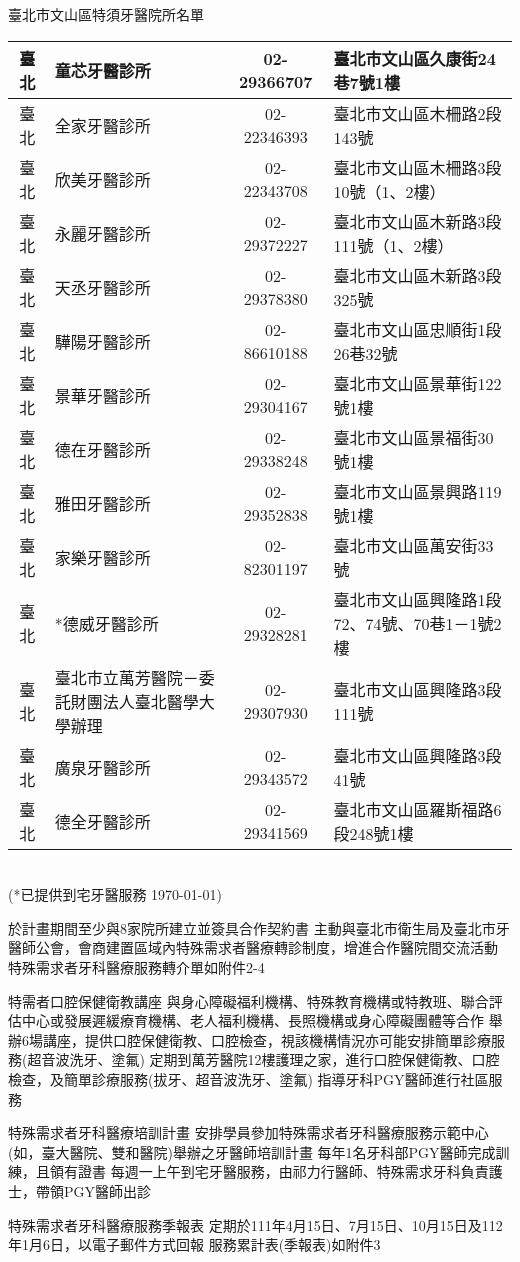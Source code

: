 臺北市文山區特須牙醫院所名單\\
\begin{tabularx}{1.0625\textwidth}{|c|p{3.2cm}|c|l|}
\hline
臺北&	童芯牙醫診所&	02-29366707 &	臺北市文山區久康街24巷7號1樓\\
\hline
臺北&	全家牙醫診所&	02-22346393 &	臺北市文山區木柵路2段143號\\
\hline
臺北 &	欣美牙醫診所 &	02-22343708 &	臺北市文山區木柵路3段10號（1、2樓）\\
\hline
臺北 &	永麗牙醫診所 &	02-29372227 &	臺北市文山區木新路3段111號（1、2樓）\\
\hline
臺北 &	天丞牙醫診所 &	02-29378380 &	臺北市文山區木新路3段325號\\
\hline
臺北 &	驊陽牙醫診所 &	02-86610188 &	臺北市文山區忠順街1段26巷32號\\
\hline
臺北 &	景華牙醫診所 &	02-29304167 &	臺北市文山區景華街122號1樓\\
\hline
臺北 &	德在牙醫診所 &	02-29338248 &	臺北市文山區景福街30號1樓\\
\hline
臺北 &	雅田牙醫診所 &	02-29352838 &	臺北市文山區景興路119號1樓\\
\hline
臺北 &	家樂牙醫診所 &	02-82301197 &	臺北市文山區萬安街33號\\
\hline
臺北 &	*德威牙醫診所 &	02-29328281 &	臺北市文山區興隆路1段72、74號、70巷1－1號2樓\\
\hline
臺北 &	臺北市立萬芳醫院－委託財團法人臺北醫學大學辦理
&	02-29307930 &	臺北市文山區興隆路3段111號\\
\hline
臺北 &	廣泉牙醫診所 &	02-29343572 &	臺北市文山區興隆路3段41號\\
\hline
臺北 &	德全牙醫診所 &	02-29341569 &	臺北市文山區羅斯福路6段248號1樓\\
\hline
\end{tabularx}\\
(*已提供到宅牙醫服務 \today)
   
\begin{outline}   
    \2 於計畫期間至少與8家院所建立並簽具合作契約書
    \2 主動與臺北市衛生局及臺北市牙醫師公會，會商建置區域內特殊需求者醫療轉診制度，增進合作醫院間交流活動
    \2 特殊需求者牙科醫療服務轉介單如附件2-4

\1 特需者口腔保健衛教講座
    \2 與身心障礙福利機構、特殊教育機構或特教班、聯合評估中心或發展遲緩療育機構、老人福利機構、長照機構或身心障礙團體等合作
    \2 舉辦6場講座，提供口腔保健衛教、口腔檢查，視該機構情況亦可能安排簡單診療服務(超音波洗牙、塗氟)
    \2 定期到萬芳醫院12樓護理之家，進行口腔保健衛教、口腔檢查，及簡單診療服務(拔牙、超音波洗牙、塗氟)
    \2 指導牙科PGY醫師進行社區服務
    
\1 特殊需求者牙科醫療培訓計畫
    \2 安排學員參加特殊需求者牙科醫療服務示範中心(如，臺大醫院、雙和醫院)舉辦之牙醫師培訓計畫
    \2 每年1名牙科部PGY醫師完成訓練，且領有證書
    \2 每週一上午到宅牙醫服務，由祁力行醫師、特殊需求牙科負責護士，帶領PGY醫師出診
    
\1 特殊需求者牙科醫療服務季報表
    \2 定期於111年4月15日、7月15日、10月15日及112年1月6日，以電子郵件方式回報
    \2 服務累計表(季報表)如附件3


\end{outline}

